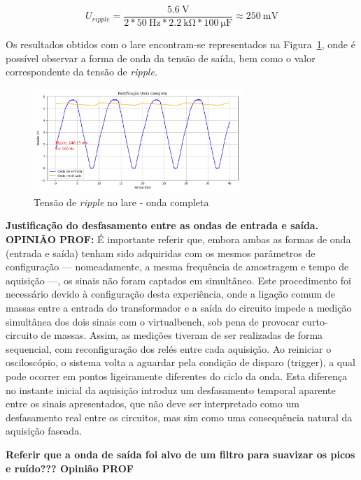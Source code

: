 \begin{equation} \label{eq:vrippleOCTeorico}
	U_{ripple} = \frac{\SI{5.6}{\volt}}{2*\SI{50}{\hertz}*\SI{2.2}{\kilo\ohm}*\SI{100}{\micro\farad}} \approx \SI{250}{\milli\volt}
\end{equation}

Os resultados obtidos com o \acrshort{lare} encontram-se representados na Figura~\ref{fig:ripplelareonda}, onde é possível observar a forma de onda da tensão de saída, bem como o valor correspondente da tensão de \textit{ripple}. 

\begin{figure}[hbtp]
	\centering
	\includegraphics[width=0.7\textwidth]{figures/onda-completa.png}
	\caption{Tensão de \textit{ripple} no \acrshort{lare} - onda completa}
	\label{fig:ripplelareonda}
\end{figure}

\textbf{Justificação do desfasamento entre as ondas de entrada e saída. OPINIÃO PROF:} É importante referir que, embora ambas as formas de onda (entrada e saída) tenham sido adquiridas com os mesmos parâmetros de configuração — nomeadamente, a mesma frequência de amostragem e tempo de aquisição —, os sinais não foram captados em simultâneo. Este procedimento foi necessário devido à configuração desta experiência, onde a ligação comum de massas entre a entrada do transformador e a saída do circuito impede a medição simultânea dos dois sinais com o \acrshort{virtualbench}, sob pena de provocar curto-circuito de massas. Assim, as medições tiveram de ser realizadas de forma sequencial, com reconfiguração dos relés entre cada aquisição. Ao reiniciar o osciloscópio, o sistema volta a aguardar pela condição de disparo (trigger), a qual pode ocorrer em pontos ligeiramente diferentes do ciclo da onda. Esta diferença no instante inicial da aquisição introduz um desfasamento temporal aparente entre os sinais apresentados, que não deve ser interpretado como um desfasamento real entre os circuitos, mas sim como uma consequência natural da aquisição faseada.

\textbf{Referir que a onda de saída foi alvo de um filtro para suavizar os picos e ruído??? Opinião PROF}

